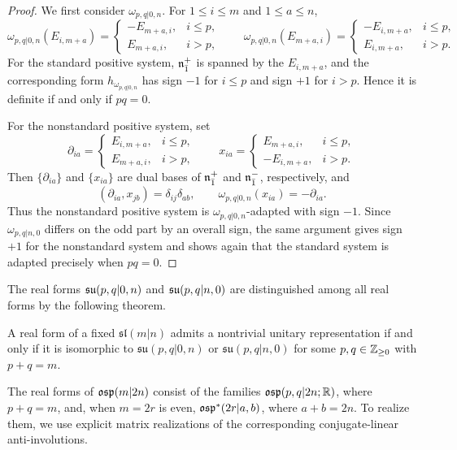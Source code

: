 \begin{proof}
We first consider $\omega_{p,q\vert 0,n}$. For $1\leq i\leq m$ and
$1\leq a\leq n$,
\[
\omega_{p,q\vert 0,n}(E_{i,m+a})
=
\begin{cases}
-E_{m+a,i},&i\leq p,\\
E_{m+a,i},&i>p,
\end{cases}
\qquad
\omega_{p,q\vert 0,n}(E_{m+a,i})
=
\begin{cases}
-E_{i,m+a},&i\leq p,\\
E_{i,m+a},&i>p.
\end{cases}
\]
For the standard positive system, ${\mathfrak{n}}_{\bar1}^{+}$ is spanned by the
$E_{i,m+a}$, and the corresponding form $h_{\omega_{p,q\vert 0,n}}$ has
sign $-1$ for $i\leq p$ and sign $+1$ for $i>p$. Hence it is definite if
and only if $pq=0$.

For the nonstandard positive system, set
\[
\partial_{ia}
=
\begin{cases}
E_{i,m+a},&i\leq p,\\
E_{m+a,i},&i>p,
\end{cases}
\qquad
x_{ia}
=
\begin{cases}
E_{m+a,i},&i\leq p,\\
-E_{i,m+a},&i>p.
\end{cases}
\]
Then $\{\partial_{ia}\}$ and $\{x_{ia}\}$ are dual bases of
${\mathfrak{n}}_{\bar1}^{+}$ and ${\mathfrak{n}}_{\bar1}^{-}$, respectively, and
\[
(\partial_{ia},x_{jb})=\delta_{ij}\delta_{ab},
\qquad
\omega_{p,q\vert 0,n}(x_{ia})=-\partial_{ia}.
\]
Thus the nonstandard positive system is $\omega_{p,q\vert 0,n}$-adapted
with sign $-1$. Since $\omega_{p,q\vert n,0}$ differs on the odd part by
an overall sign, the same argument gives sign $+1$ for the nonstandard
system and shows again that the standard system is adapted precisely when
$pq=0$.
\end{proof}

The real forms ${\mathfrak{su}}(p,q\vert 0,n)$ and ${\mathfrak{su}}(p,q\vert n,0)$ are distinguished among all real forms by the following theorem.

\begin{theorem}
A real form of a fixed $\mathfrak{sl}(m\vert n)$ admits a nontrivial unitary representation if and only if it is isomorphic to $\mathfrak{su}(p,q\vert0,n)$ or $\mathfrak{su}(p,q\vert n,0)$ for some $p,q\in{\mathbb Z}_{\geq0}$ with $p+q=m$.
\end{theorem}

The real forms of ${\mathfrak{osp}}(m\vert 2n)$ consist of the families
${\mathfrak{osp}}(p,q\vert 2n;{\mathbb R})$, where $p+q=m$, and, when $m=2r$ is even,
${\mathfrak{osp}}^{\ast}(2r\vert a,b)$, where $a+b=2n$. To realize them, we use explicit
matrix realizations of the corresponding conjugate-linear anti-involutions.

